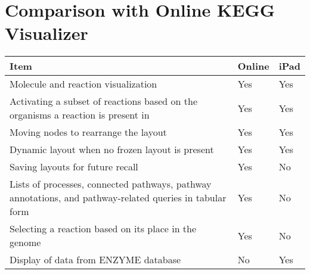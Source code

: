 \section{Comparison with Online KEGG Visualizer}
\label{sect:kegg_comparison}

\begin{tabular}{ | p{3in} | l | l | }
    \hline
    Item                & Online    & iPad \\ \hline

    Molecule and reaction visualization
                        & Yes       & Yes \\ \hline

    Activating a subset of reactions based on the organisms a reaction is
    present in
                        & Yes       & Yes \\ \hline

    Moving nodes to rearrange the layout
                        & Yes       & Yes \\ \hline

    Dynamic layout when no frozen layout is present
                        & Yes       & Yes \\ \hline

    Saving layouts for future recall
                        & Yes       & No \\ \hline

    Lists of processes, connected pathways, pathway annotations, and
    pathway-related queries in tabular form
                        & Yes       & No \\ \hline

    Selecting a reaction based on its place in the genome
                        & Yes       & No \\ \hline

    Display of data from ENZYME database
                        & No        & Yes \\ \hline
\end{tabular}
